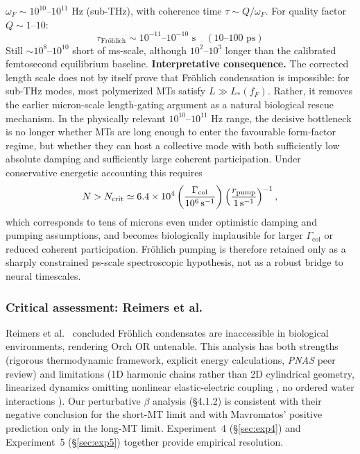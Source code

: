 \documentclass[twocolumn,10pt]{article}
\newcommand{\ps}{\text{~ps}}
\newcommand{\Hz}{\text{~Hz}}
\begin{document}
$\omega_F \sim 10^{10}\text{--}10^{11}\Hz$ (sub-THz), with coherence time
$\tau \sim Q/\omega_F$. For quality factor $Q \sim 1\text{--}10$:
\begin{equation}
\tau_{\text{Fr\"{o}hlich}} \sim 10^{-11}\text{--}10^{-10}\text{~s}
\quad (10\text{--}100\ps)
\end{equation}
Still $\sim 10^{8}\text{--}10^{10}$ short of ms-scale, although
$10^{2}\text{--}10^{3}$ longer than the calibrated femtosecond equilibrium
baseline.
\textbf{Interpretative consequence.}
The corrected length scale does not by itself prove that Fr\"ohlich
condensation is impossible: for sub-THz modes, most polymerized MTs satisfy
$L\gg L_*(f_F)$. Rather, it removes the earlier micron-scale length-gating
argument as a natural biological rescue mechanism. In the physically relevant
$10^{10}$--$10^{11}$ Hz range, the decisive bottleneck is no longer whether
MTs are long enough to enter the favourable form-factor regime, but whether
they can host a collective mode with both sufficiently low absolute damping
and sufficiently large coherent participation. Under conservative energetic
accounting this requires
\[
N>N_{\rm crit}\simeq6.4\times10^4
\left(\frac{\Gamma_{\text{col}}}{10^6\,{\rm s}^{-1}}\right)
\left(\frac{r_{\rm pump}}{1\,{\rm s}^{-1}}\right)^{-1},
\]
which corresponds to tens of microns even under optimistic damping and pumping
assumptions, and becomes biologically implausible for larger
$\Gamma_{\text{col}}$ or reduced coherent participation. Fr\"ohlich pumping is
therefore retained only as a sharply constrained ps-scale spectroscopic
hypothesis, not as a robust bridge to neural timescales.

\subsubsection{Critical assessment: Reimers et al.}
Reimers et al.\ \cite{Reimers2009} concluded Fr\"ohlich condensates are
inaccessible in biological environments, rendering Orch OR untenable. This
analysis has both strengths (rigorous thermodynamic framework, explicit
energy calculations, \textit{PNAS} peer review) and limitations (1D
harmonic chains rather than 2D cylindrical geometry, linearized dynamics
omitting nonlinear elastic-electric coupling \cite{Pokorn2011}, no ordered
water interactions \cite{Mavromatos2025}). Our perturbative $\beta$
analysis (\S 4.1.2) is consistent with their negative conclusion for the
short-MT limit and with Mavromatos' positive prediction only in the
long-MT limit. Experiment~4 (\S\ref{sec:exp4}) and Experiment~5
(\S\ref{sec:exp5}) together provide empirical resolution.
\end{document}
